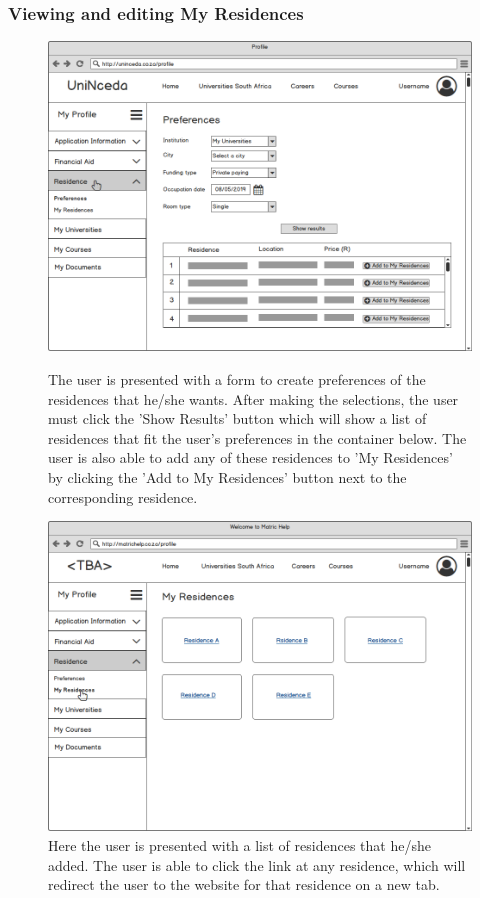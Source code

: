 \documentclass[a4paper, 12pt]{article}
\begin{document}
\subsubsection{Viewing and editing My Residences}

\setcounter{figure}{0}

\begin{figure}[H]
\centering
\includegraphics[scale=0.35]{ProfileResidencePreferences}
\caption{The user is presented with a form to create preferences of the residences that he/she wants. After making the selections, the user must click the 'Show Results' button which will show a list of residences that fit the user's preferences in the container below. The user is also able to add any of these residences to 'My Residences' by clicking the 'Add to My Residences' button next to the corresponding residence.}
\label{ProfileResidencePreferences}

\vspace{1cm}

\includegraphics[scale=0.35]{ProfileResidenceResidences}
\caption{Here the user is presented with a list of residences that he/she added. The user is able to click the link at any residence, which will redirect the user to the website for that residence on a new tab.}
\label{ProfileResidenceResidences}


\end{figure}
\end{document}
